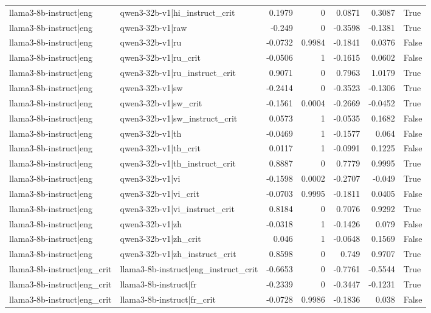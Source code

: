\begin{table}
\begin{tabular}{l l r r r r l}
llama3-8b-instruct|eng & qwen3-32b-v1|hi_instruct_crit & 0.1979 & 0 & 0.0871 & 0.3087 & True \\
llama3-8b-instruct|eng & qwen3-32b-v1|raw & -0.249 & 0 & -0.3598 & -0.1381 & True \\
llama3-8b-instruct|eng & qwen3-32b-v1|ru & -0.0732 & 0.9984 & -0.1841 & 0.0376 & False \\
llama3-8b-instruct|eng & qwen3-32b-v1|ru_crit & -0.0506 & 1 & -0.1615 & 0.0602 & False \\
llama3-8b-instruct|eng & qwen3-32b-v1|ru_instruct_crit & 0.9071 & 0 & 0.7963 & 1.0179 & True \\
llama3-8b-instruct|eng & qwen3-32b-v1|sw & -0.2414 & 0 & -0.3523 & -0.1306 & True \\
llama3-8b-instruct|eng & qwen3-32b-v1|sw_crit & -0.1561 & 0.0004 & -0.2669 & -0.0452 & True \\
llama3-8b-instruct|eng & qwen3-32b-v1|sw_instruct_crit & 0.0573 & 1 & -0.0535 & 0.1682 & False \\
llama3-8b-instruct|eng & qwen3-32b-v1|th & -0.0469 & 1 & -0.1577 & 0.064 & False \\
llama3-8b-instruct|eng & qwen3-32b-v1|th_crit & 0.0117 & 1 & -0.0991 & 0.1225 & False \\
llama3-8b-instruct|eng & qwen3-32b-v1|th_instruct_crit & 0.8887 & 0 & 0.7779 & 0.9995 & True \\
llama3-8b-instruct|eng & qwen3-32b-v1|vi & -0.1598 & 0.0002 & -0.2707 & -0.049 & True \\
llama3-8b-instruct|eng & qwen3-32b-v1|vi_crit & -0.0703 & 0.9995 & -0.1811 & 0.0405 & False \\
llama3-8b-instruct|eng & qwen3-32b-v1|vi_instruct_crit & 0.8184 & 0 & 0.7076 & 0.9292 & True \\
llama3-8b-instruct|eng & qwen3-32b-v1|zh & -0.0318 & 1 & -0.1426 & 0.079 & False \\
llama3-8b-instruct|eng & qwen3-32b-v1|zh_crit & 0.046 & 1 & -0.0648 & 0.1569 & False \\
llama3-8b-instruct|eng & qwen3-32b-v1|zh_instruct_crit & 0.8598 & 0 & 0.749 & 0.9707 & True \\
llama3-8b-instruct|eng_crit & llama3-8b-instruct|eng_instruct_crit & -0.6653 & 0 & -0.7761 & -0.5544 & True \\
llama3-8b-instruct|eng_crit & llama3-8b-instruct|fr & -0.2339 & 0 & -0.3447 & -0.1231 & True \\
llama3-8b-instruct|eng_crit & llama3-8b-instruct|fr_crit & -0.0728 & 0.9986 & -0.1836 & 0.038 & False \\

\end{tabular}
\end{table}
